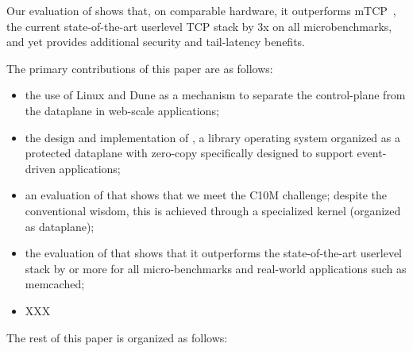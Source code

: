  Our evaluation of \ix shows that, on comparable hardware, it
outperforms mTCP~\cite{jeong2014mtcp}, the current state-of-the-art userlevel TCP stack by
3x on all microbenchmarks, and yet provides additional security and
tail-latency benefits.

The primary contributions of this paper are as follows:

\begin{itemize}

\item  the use of Linux and Dune as a mechanism to separate the control-plane from the dataplane in web-scale applications;

\item the design and implementation of \ix, a library operating system
  organized as a protected dataplane with zero-copy specifically
  designed to support event-driven applications;

\item an evaluation of \ix that shows that we meet the C10M challenge;
  despite the conventional wisdom, this is achieved through a
  specialized kernel (organized as dataplane);

\item the evaluation of \ix that shows that it outperforms the
  state-of-the-art userlevel stack by  or more for all
  micro-benchmarks and real-world applications such as memcached;

\item XXX

\end{itemize}


The rest of this paper is organized as follows: 





